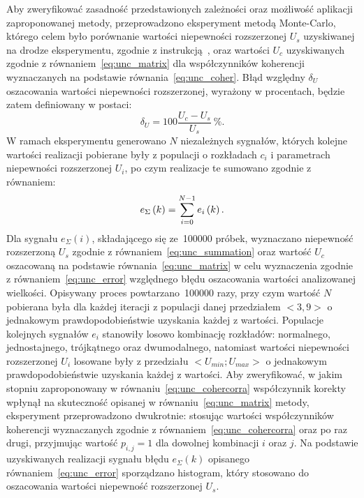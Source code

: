 Aby zweryfikować zasadność przedstawionych zależności oraz możliwość aplikacji zaproponowanej metody, przeprowadzono eksperyment metodą Monte-Carlo, którego celem było porównanie wartości niepewności rozszerzonej $U_{s}$ uzyskiwanej na drodze eksperymentu, zgodnie z instrukcją~\cite{jcgm_montecarlo}, oraz wartości $U_{c}$ uzyskiwanych zgodnie z równaniem~\eqref{eq:unc_matrix} dla współczynników koherencji wyznaczanych na podstawie równania~\eqref{eq:unc_coher}. Błąd względny $\delta_{U}$ oszacowania wartości niepewności rozszerzonej, wyrażony w procentach, będzie zatem definiowany w postaci:
\begin{equation}
\delta_{U} = 100 \frac{U_{c} - U_{s}}{U_{s}}~\unit{\percent} \label{eq:unc_error}.
\end{equation}
W ramach eksperymentu generowano $N$ niezależnych sygnałów, których kolejne wartości realizacji pobierane były z populacji o rozkładach $c_{i}$ i parametrach niepewności rozszerzonej $U_{i}$, po czym realizacje te sumowano zgodnie z równaniem:
\begin{equation}
e_{\Sigma} \left(k\right) = \sum _{i=0} ^{N-1} e_{i} \left(k\right) \label{eq:unc_testsignal}.
\end{equation}
Dla sygnału $e_{\Sigma}(i)$, składającego się ze~\num{100000} próbek, wyznaczano niepewność rozszerzoną $U_{s}$ zgodnie z równaniem~\eqref{eq:unc_summation} oraz wartość $U_{c}$ oszacowaną na podstawie równania~\eqref{eq:unc_matrix} w celu wyznaczenia zgodnie z równaniem~\eqref{eq:unc_error} względnego błędu oszacowania wartości analizowanej wielkości. Opisywany proces powtarzano~\num{100000} razy, przy czym wartość $N$ pobierana była dla każdej iteracji z populacji danej przedziałem $<3,9>$ o jednakowym prawdopodobieństwie uzyskania każdej z wartości. Populacje kolejnych sygnałów $e_{i}$ stanowiły losowo kombinację rozkładów: normalnego, jednostajnego, trójkątnego oraz dwumodalnego, natomiast wartości niepewności rozszerzonej $U_{i}$ losowane były z przedziału $<U_{min};U_{max}>$ o jednakowym prawdopodobieństwie uzyskania każdej z wartości. Aby zweryfikować, w jakim stopniu zaproponowany w równaniu~\eqref{eq:unc_cohercorra} współczynnik korekty wpłynął na skuteczność opisanej w równaniu~\eqref{eq:unc_matrix} metody, eksperyment przeprowadzono dwukrotnie: stosując wartości współczynników koherencji wyznaczanych zgodnie z równaniem~\eqref{eq:unc_cohercorra} oraz po raz drugi, przyjmując wartość $p_{i,j} = 1$ dla dowolnej kombinacji $i$ oraz $j$. Na podstawie uzyskiwanych realizacji sygnału błędu $e_{\Sigma}(k)$ opisanego równaniem~\eqref{eq:unc_error} sporządzano histogram, który stosowano do oszacowania wartości niepewność rozszerzonej $U_{s}$.

